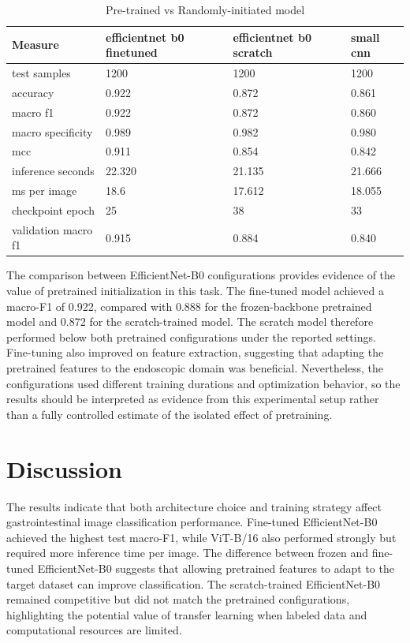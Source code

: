 \documentclass[conference]{IEEEtran}
\begin{document}
\begin{table}[ht]
\caption{Pre-trained vs Randomly-initiated model}
\begin{center}
\begin{tabular}{|m{8em}|m{4em}|m{4em}|m{4em}|}
\hline
Measure & efficientnet b0 finetuned & efficientnet b0 scratch & small cnn \\
\hline
test samples & 1200 & 1200 & 1200 \\
accuracy & 0.922 & 0.872 & 0.861 \\
macro f1 & 0.922 & 0.872 & 0.860 \\
macro specificity & 0.989 & 0.982 & 0.980 \\
mcc & 0.911 & 0.854 & 0.842 \\
inference seconds & 22.320 & 21.135 & 21.666 \\
ms per image & 18.6 & 17.612 & 18.055 \\
checkpoint epoch & 25 & 38 & 33 \\
validation macro f1 & 0.915 & 0.884 & 0.840 \\
\hline
\end{tabular}
\label{tables:tab9}
\end{center}
\end{table}

The comparison between EfficientNet-B0 configurations provides evidence of the value of pretrained initialization in this task. The fine-tuned model achieved a macro-F1 of 0.922, compared with 0.888 for the frozen-backbone pretrained model and 0.872 for the scratch-trained model. The scratch model therefore performed below both pretrained configurations under the reported settings. Fine-tuning also improved on feature extraction, suggesting that adapting the pretrained features to the endoscopic domain was beneficial. Nevertheless, the configurations used different training durations and optimization behavior, so the results should be interpreted as evidence from this experimental setup rather than a fully controlled estimate of the isolated effect of pretraining.

\section{Discussion}

The results indicate that both architecture choice and training strategy affect gastrointestinal image classification performance. Fine-tuned EfficientNet-B0 achieved the highest test macro-F1, while ViT-B/16 also performed strongly but required more inference time per image. The difference between frozen and fine-tuned EfficientNet-B0 suggests that allowing pretrained features to adapt to the target dataset can improve classification. The scratch-trained EfficientNet-B0 remained competitive but did not match the pretrained configurations, highlighting the potential value of transfer learning when labeled data and computational resources are limited.
\end{document}
